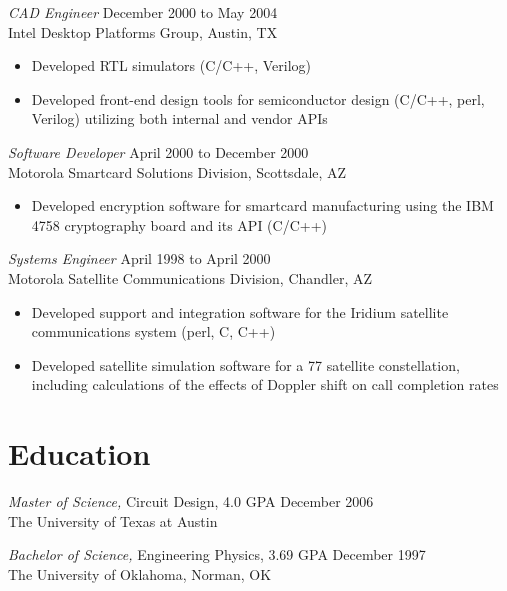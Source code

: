 \documentclass[overlapped]{res}
\begin{document}
\begin{resume}
\begin{itemize}
\end{itemize}
{\sl CAD Engineer} \hfill December 2000 to May 2004 \\
	Intel Desktop Platforms Group, Austin, TX
\begin{itemize}
	\item Developed RTL simulators (C/C++, Verilog)
	\item Developed front-end design tools for semiconductor design (C/C++, perl, Verilog) utilizing both internal and vendor APIs
\end{itemize}
{\sl Software Developer} \hfill April 2000 to December 2000 \\
	Motorola Smartcard Solutions Division, Scottsdale, AZ
\begin{itemize}
	\item Developed encryption software for smartcard manufacturing using the IBM 4758 cryptography board and its API (C/C++)
\end{itemize}
{\sl Systems Engineer} \hfill April 1998 to April 2000 \\
	Motorola Satellite Communications Division, Chandler, AZ
\begin{itemize}
	\item Developed support and integration software for the Iridium satellite communications system (perl, C, C++)
	\item Developed satellite simulation software for a 77 satellite constellation, including calculations of the effects of Doppler shift on call completion rates
\end{itemize}
\section{Education} 
{\sl Master of Science,} Circuit Design, 4.0 GPA \hfill December 2006\\
                The University of Texas at Austin                 

{\sl Bachelor of Science,} Engineering Physics, 3.69 GPA \hfill December 1997\\
                The University of Oklahoma, Norman, OK\\
\end{resume}
\end{document}
